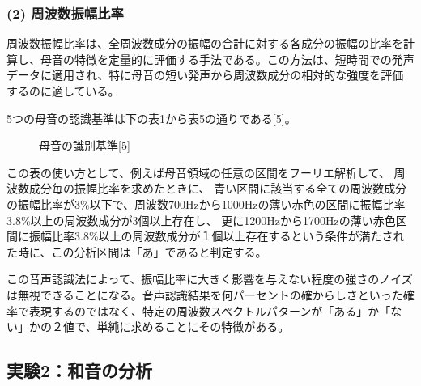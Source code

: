 \documentclass{article}
\begin{document}
\subsubsection*{(2) 周波数振幅比率}
\begin{spacing}{1.2}
    周波数振幅比率は、全周波数成分の振幅の合計に対する各成分の振幅の比率を計算し、母音の特徴を定量的に評価する手法である。この方法は、短時間での発声データに適用され、特に母音の短い発声から周波数成分の相対的な強度を評価するのに適している。

    5つの母音の認識基準は下の表1から表5の通りである[5]。
    \begin{figure}[ht] %
        \centering
        \caption{母音の識別基準[5]}
    \end{figure}
    \FloatBarrier
    この表の使い方として、例えば母音領域の任意の区間をフーリエ解析して、
    周波数成分毎の振幅比率を求めたときに、
    青い区間に該当する全ての周波数成分の振幅比率が3\%以下で、周波数700Hzから1000Hzの薄い赤色の区間に振幅比率3.8\%以上の周波数成分が3個以上存在し、
    更に1200Hzから1700Hzの薄い赤色区間に振幅比率3.8\%以上の周波数成分が１個以上存在するという条件が満たされた時に、この分析区間は「あ」であると判定する。
    
    この音声認識法によって、振幅比率に大きく影響を与えない程度の強さのノイズは無視できることになる。音声認識結果を何パーセントの確からしさといった確率で表現するのではなく、特定の周波数スペクトルパターンが「ある」か「ない」かの２値で、単純に求めることにその特徴がある。
\end{spacing}

\newpage

\subsection{実験2：和音の分析}
\end{document}
